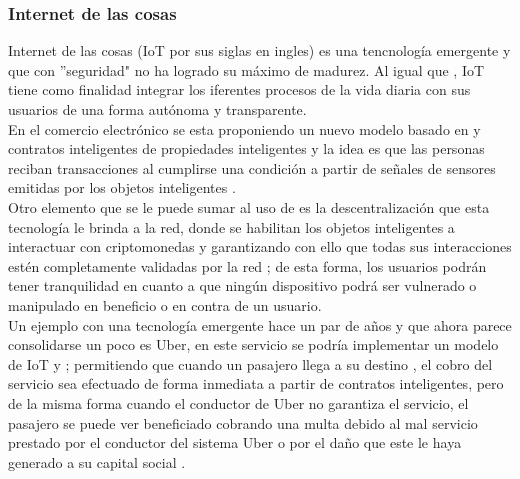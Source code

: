 \subsubsection{Internet de las cosas}
Internet de las cosas (IoT por sus siglas en ingles) es una tencnología emergente y que con ''seguridad" no ha logrado su máximo de madurez. Al igual que \blckchn, IoT tiene como finalidad integrar los iferentes procesos de la vida diaria con sus usuarios de una forma autónoma y transparente.
\\
En el comercio electrónico se esta proponiendo un nuevo modelo basado en \blckchn y contratos inteligentes de propiedades inteligentes y la idea es que las personas reciban transacciones al cumplirse una condición  a partir de señales de sensores emitidas por los  objetos inteligentes \citep{zheng2016blockchain}.
\\
Otro elemento que se le puede sumar al uso de \blckchn es la descentralización que esta tecnología le brinda a la red, donde se habilitan los objetos inteligentes a interactuar con criptomonedas y garantizando con ello que todas sus interacciones estén completamente validadas por la red \citep{crosby2016blockchain}; de esta forma, los usuarios podrán tener tranquilidad en cuanto a que ningún dispositivo podrá ser vulnerado o manipulado en beneficio o en contra de un usuario.
\\
Un ejemplo con una tecnología emergente hace un par de años y que ahora parece consolidarse un poco es Uber, en este servicio se podría implementar un modelo de IoT y \blckchn; permitiendo que cuando un pasajero llega a su destino , el cobro del servicio sea efectuado de forma inmediata a partir de contratos inteligentes, pero de la misma forma cuando el conductor de Uber no garantiza el servicio, el pasajero se puede ver beneficiado cobrando una multa debido al mal servicio prestado por el conductor del sistema Uber o por el daño que este le haya generado a su capital social \citep{huckle2016internet}.



